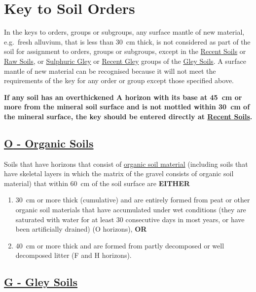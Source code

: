 \documentclass[
  letterpaper,
  DIV=11,
  numbers=noendperiod]{scrreprt}
\providecommand{\tightlist}{%
  \setlength{\itemsep}{0pt}\setlength{\parskip}{0pt}}\usepackage{longtable,booktabs,array}
\begin{document}
\hypertarget{sec-key}{%
\chapter{Key to Soil Orders}\label{sec-key}}

In the keys to orders, groups or subgroups, any surface mantle of new
material, e.g.~fresh alluvium, that is less than 30~cm thick, is not
considered as part of the soil for assignment to orders, groups or
subgroups, except in the \protect\hyperlink{sec-ord-R}{Recent Soils} or
\protect\hyperlink{sec-ord-W}{Raw Soils}, or
\protect\hyperlink{sec-key-GU}{Sulphuric Gley} or
\protect\hyperlink{sec-key-GR}{Recent Gley} groups of the
\protect\hyperlink{sec-ord-G}{Gley Soils}. A surface mantle of new
material can be recognised because it will not meet the requirements of
the key for any order or group except those specified above.

\textbf{If any soil has an overthickened A horizon with its base at
45~cm or more from the mineral soil surface and is not mottled within
30~cm of the mineral surface, the key should be entered directly at
\protect\hyperlink{sec-R}{Recent Soils}.}

\hypertarget{sec-O}{%
\section{\texorpdfstring{\protect\hyperlink{sec-ord-O}{\textbf{O} -
Organic Soils}}{O - Organic Soils}}\label{sec-O}}

Soils that have horizons that consist of
\protect\hyperlink{sec-diag-org}{organic soil material} (including soils
that have skeletal layers in which the matrix of the gravel consists of
organic soil material) that within 60~cm of the soil surface are
\textbf{EITHER}

\begin{enumerate}
\def\labelenumi{\arabic{enumi}.}
\tightlist
\item
  30~cm or more thick (cumulative) and are entirely formed from peat or
  other organic soil materials that have accumulated under wet
  conditions (they are saturated with water for at least 30 consecutive
  days in most years, or have been artificially drained) (O horizons),
  \textbf{OR}
\item
  40~cm or more thick and are formed from partly decomposed or well
  decomposed litter (F and H horizons).
\end{enumerate}

\hypertarget{sec-G}{%
\section{\texorpdfstring{\protect\hyperlink{sec-ord-G}{\textbf{G} - Gley
Soils}}{G - Gley Soils}}\label{sec-G}}
\end{document}
